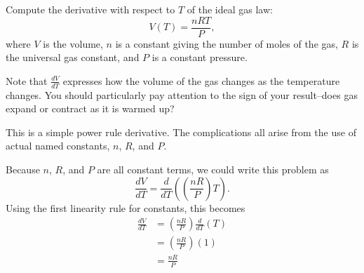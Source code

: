 \documentclass{ximera}
\author{Emma Smith Zbarsky}
\begin{document}
\begin{exercise}

Compute the derivative with respect to $T$ of the ideal gas law:
\[V(T) = \frac{nRT}{P},\] where $V$ is the volume, $n$ is a constant
giving the number of moles of the gas, $R$ is the universal gas
constant, and $P$ is a constant pressure.

Note that $\frac{dV}{dT}$ expresses how the volume of the gas changes as
the temperature changes. You should particularly pay attention to the
sign of your result--does gas expand or contract as it is warmed up?


\begin{hint}
This is a simple power rule derivative. The complications all arise from
the use of actual named constants, $n$, $R$, and $P$.
\end{hint}


\begin{hint}
Because $n$, $R$, and $P$ are all constant terms, we could write this
problem as
\[\frac{dV}{dT} = \frac{d}{dT}\left(\left(\frac{nR}{P}\right)T\right).\]
Using the first linearity rule for constants, this becomes
\begin{align*}
\frac{dV}{dT} &= \left(\frac{nR}{P}\right)\frac{d}{dT}\left(T\right) \\
&= \left(\frac{nR}{P}\right)(1) \\
&= \boxed{\frac{nR}{P}}
\end{align*}
\end{hint}


\begin{multipleChoice}
\end{multipleChoice}

\end{exercise}
\end{document}
